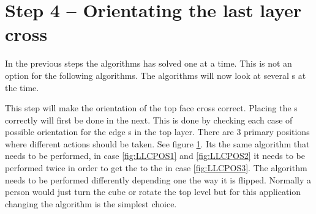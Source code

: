 \section{Step 4 -- Orientating the last layer cross}
In the previous steps the algorithms has solved one \cpiece{} at a time. This is not an option for the following algorithms. The algorithms will now look at several \cpiece{}s at the time. 

This step will make the orientation of the top face cross correct. Placing the \cpiece{}s correctly will first be done in the next. This is done by checking each case of possible orientation for the edge \cpiece{}s in the top layer. There are 3 primary positions where different actions should be taken. See figure \ref{fig:LLCPOS}. Its the same algorithm that needs to be performed, in case \ref{fig:LLCPOS1} and \ref{fig:LLCPOS2} it needs to be performed twice in order to get the to the in case \ref{fig:LLCPOS3}. The algorithm needs to be performed differently depending one the way it is flipped. Normally a person would just turn the cube or rotate the top level but for this application changing the algorithm is the simplest choice. 

\begin{figure}[htb]
	\centering
		\hspace{0.02\textwidth}
		\hspace{0.02\textwidth}
		\caption{}
		\label{fig:LLCPOS}
\end{figure}


